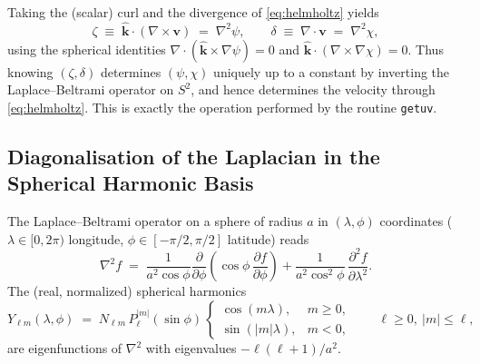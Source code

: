 \documentclass[11pt]{article}
\newcommand{\bvec}[1]{\boldsymbol{#1}}
\begin{document}
Taking the (scalar) curl and the divergence of \eqref{eq:helmholtz}
yields
\begin{equation}
    \zeta \;\equiv\; \hat{\bvec{k}}\!\cdot\!(\nabla\!\times\!\bvec{v})
          \;=\; \nabla^{2}\psi,
    \qquad
    \delta \;\equiv\; \nabla\!\cdot\!\bvec{v}
          \;=\; \nabla^{2}\chi ,
    \label{eq:hh-laplacians}
\end{equation}
using the spherical identities
$\nabla\!\cdot\!(\hat{\bvec{k}}\!\times\!\nabla\psi)=0$
and
$\hat{\bvec{k}}\!\cdot\!(\nabla\!\times\!\nabla\chi)=0$.
Thus knowing $(\zeta,\delta)$ determines $(\psi,\chi)$ uniquely up to a
constant by inverting the Laplace--Beltrami operator on $S^{2}$, and
hence determines the velocity through \eqref{eq:helmholtz}.  This is
exactly the operation performed by the routine \texttt{getuv}.

\subsection{Diagonalisation of the Laplacian in the Spherical Harmonic
            Basis}

The Laplace--Beltrami operator on a sphere of radius $a$ in
$(\lambda,\phi)$ coordinates ($\lambda\in[0,2\pi)$ longitude,
$\phi\in[-\pi/2,\pi/2]$ latitude) reads
\begin{equation}
    \nabla^{2} f \;=\;
        \frac{1}{a^{2}\cos\phi}\frac{\partial}{\partial\phi}\!
        \left(\cos\phi\,\frac{\partial f}{\partial\phi}\right)
        +
        \frac{1}{a^{2}\cos^{2}\phi}\,\frac{\partial^{2} f}{\partial\lambda^{2}}.
    \label{eq:laplace-beltrami}
\end{equation}
The (real, normalized) spherical harmonics
\begin{equation}
    Y_{\ell m}(\lambda,\phi) \;=\;
        N_{\ell m}\, P_{\ell}^{|m|}(\sin\phi)\,
        \begin{cases}\cos(m\lambda),& m\ge 0,\\ \sin(|m|\lambda),& m<0,\end{cases}
        \qquad \ell\ge 0,\ |m|\le \ell,
\end{equation}
are eigenfunctions of $\nabla^{2}$ with eigenvalues
$-\ell(\ell+1)/a^{2}$.
\end{document}
